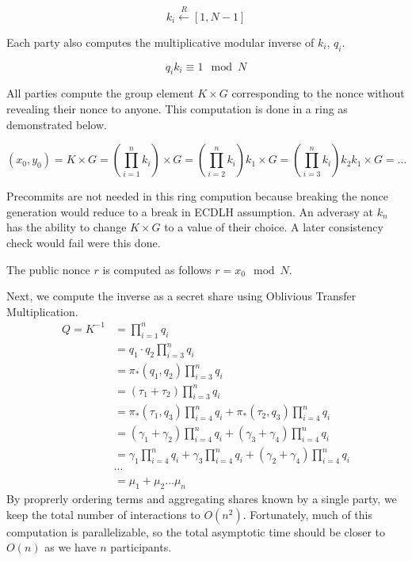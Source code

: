 \documentclass{article}
\newcommand{\mulOT}{\pi_{*}}
\begin{document}
$$k_i \xleftarrow{R} [1, N-1]$$

Each party also computes the multiplicative modular inverse of $k_i$, $q_i$. 

$$q_i k_i \equiv 1 \mod N$$

All parties compute the group element $K\times G$ corresponding to the nonce without revealing their nonce to anyone. This computation is done in a ring as demonstrated below.

$$(x_0, y_0) = K \times G = \left(\prod_{i=1}^n  k_i\right) \times G = \left(\prod_{i=2}^n k_i\right) k_1 \times G = \left(\prod_{i=3}^n k_i\right) k_2 k_1 \times G=\ldots$$

Precommits are not needed in this ring compution because breaking the nonce generation would reduce to a break in ECDLH assumption. An adverasy at $k_n$ has the ability to change $K\times G$ to a value of their choice. A later consistency check would fail were this done.

The public nonce $r$ is computed as follows $ r = x_0 \mod N $.

Next, we compute the inverse as a secret share using Oblivious Transfer Multiplication.
\begin{equation*}
    \begin{split}
        Q = K^{-1} &= \prod_{i=1}^n q_i \\
        &= q_1\cdot q_2  \prod_{i=3}^n q_i\\ 
        &= \mulOT(q_1, q_2) \prod_{i=3}^n q_i \\
        &= (\tau_1 + \tau_2) \prod_{i=3}^n q_i \\
        &= \mulOT(\tau_1, q_3) \prod_{i=4}^n q_i + \mulOT(\tau_2, q_3) \prod_{i=4}^n q_i \\
        &= (\gamma_1 + \gamma_2) \prod_{i=4}^n q_i + (\gamma_3 + \gamma_4) \prod_{i=4}^n q_i\\
        &= \gamma_1  \prod_{i=4}^n q_i+ \gamma_3  \prod_{i=4}^n q_i+ (\gamma_2 + \gamma_4) \prod_{i=4}^n q_i \\
        &\cdots \\
        &= \mu_1 + \mu_2 \ldots \mu_n
    \end{split}
\end{equation*}
 By proprerly ordering terms and aggregating shares known by a single party, we keep the total number of interactions to $O(n^2)$. Fortunately, much of this computation is parallelizable, so the total asymptotic time should be closer to $O(n)$ as we have $n$ participants.
\end{document}
